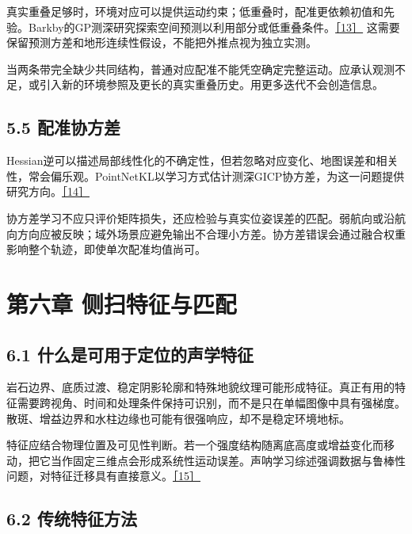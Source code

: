 真实重叠足够时，环境对应可以提供运动约束；低重叠时，配准更依赖初值和先验。Barkby的GP测深研究探索空间预测以利用部分或低重叠条件。\href{https://www-personal.acfr.usyd.edu.au/sbarkby/2011_iros_bpslam.pdf}{［13］} 这需要保留预测方差和地形连续性假设，不能把外推点视为独立实测。

当两条带完全缺少共同结构，普通对应配准不能凭空确定完整运动。应承认观测不足，或引入新的环境参照及更长的真实重叠历史。用更多迭代不会创造信息。

\hypertarget{ux914dux51c6ux534fux65b9ux5dee}{%
\subsection{5.5 配准协方差}\label{ux914dux51c6ux534fux65b9ux5dee}}

Hessian逆可以描述局部线性化的不确定性，但若忽略对应变化、地图误差和相关性，常会偏乐观。PointNetKL以学习方式估计测深GICP协方差，为这一问题提供研究方向。\href{https://arxiv.org/abs/2003.10931}{［14］}

协方差学习不应只评价矩阵损失，还应检验与真实位姿误差的匹配。弱航向或沿航向方向应被反映；域外场景应避免输出不合理小方差。协方差错误会通过融合权重影响整个轨迹，即使单次配准均值尚可。

\hypertarget{ux7b2cux516dux7ae0-ux4fa7ux626bux7279ux5f81ux4e0eux5339ux914d}{%
\section{第六章 侧扫特征与匹配}\label{ux7b2cux516dux7ae0-ux4fa7ux626bux7279ux5f81ux4e0eux5339ux914d}}

\hypertarget{ux4ec0ux4e48ux662fux53efux7528ux4e8eux5b9aux4f4dux7684ux58f0ux5b66ux7279ux5f81}{%
\subsection{6.1 什么是可用于定位的声学特征}\label{ux4ec0ux4e48ux662fux53efux7528ux4e8eux5b9aux4f4dux7684ux58f0ux5b66ux7279ux5f81}}

岩石边界、底质过渡、稳定阴影轮廓和特殊地貌纹理可能形成特征。真正有用的特征需要跨视角、时间和处理条件保持可识别，而不是只在单幅图像中具有强梯度。散斑、增益边界和水柱边缘也可能有很强响应，却不是稳定环境地标。

特征应结合物理位置及可见性判断。若一个强度结构随离底高度或增益变化而移动，把它当作固定三维点会形成系统性运动误差。声呐学习综述强调数据与鲁棒性问题，对特征迁移具有直接意义。\href{https://arxiv.org/abs/2412.11840}{［15］}

\hypertarget{ux4f20ux7edfux7279ux5f81ux65b9ux6cd5}{%
\subsection{6.2 传统特征方法}\label{ux4f20ux7edfux7279ux5f81ux65b9ux6cd5}}

